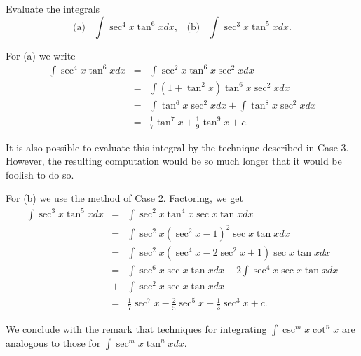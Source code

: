 \begin{example}
Evaluate the integrals
$$
\mbox{(a)}\;\;\;  \int \sec^{4} x \tan^{6} xdx, \;\;\;\mbox{(b)}\;\;\; \int \sec^{3} x \tan^{5} xdx.
$$
   
For (a) we write 
\begin{eqnarray*}
\int \sec^{4}x \tan^{6}x dx &=& \int \sec^{2}x \tan^{6} x \sec^{2}x dx \\
&=& \int (1 + \tan^{2}x) \tan^{6}x \sec^{2}x dx \\
&=& \int \tan^{6}x \sec^{2}x dx + \int \tan^{8}x \sec^{2}x dx\\
&=& \frac{1}{7} \tan^{7}x + \frac{1}{9} \tan^{9}x + c.
\end{eqnarray*}

\noindent It is also possible to evaluate this integral by the technique described in Case 3. 
However, the resulting computation would be so much longer that it would be foolish to do so.

For (b) we use the method of Case 2. Factoring, we get
\begin{eqnarray*}
\int \sec^{3} x \tan^{5} x dx 
&=&  \int \sec^{2} x \tan^{4} x \sec x \tan x dx \\
&=& \int \sec^{2} x (\sec^{2} x - 1)^{2} \sec x \tan x dx \\
&=& \int \sec^{2} x (\sec^{4} x - 2 \sec^{2} x + 1) \sec x \tan x dx \\
&=& \int \sec^{6} x \sec x \tan x dx - 2\int \sec^{4} x \sec x \tan x dx \\
&+& \int \sec^{2} x \sec x \tan x dx \\
&=& \frac{1}{7} \sec^{7} x - \frac{2}{5} \sec^{5} x + \frac{1}{3} \sec^{3} x + c.
\end{eqnarray*}

We conclude with the remark that techniques for integrating $\int \csc^{m} x \cot^{n}x$ are analogous to those for $\int \sec^{m} x \tan^{n} x dx$.
\end{example}
